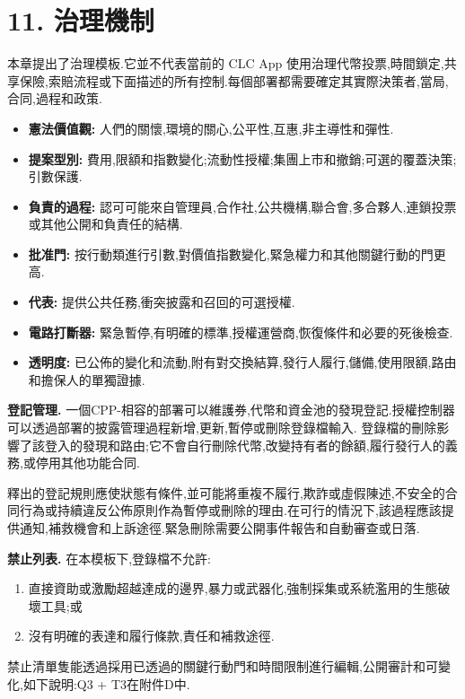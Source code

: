 \documentclass[11pt]{article}
\begin{document}
\section*{11. 治理機制}

本章提出了治理模板.它並不代表當前的 CLC App 使用治理代幣投票,時間鎖定,共享保險,索賠流程或下面描述的所有控制.每個部署都需要確定其實際決策者,當局,合同,過程和政策.

\begin{itemize}[leftmargin=*]
\item \textbf{憲法價值觀:} 人們的關懷,環境的關心,公平性,互惠,非主導性和彈性.
\item \textbf{提案型別:} 費用,限額和指數變化;流動性授權;集團上市和撤銷;可選的覆蓋決策;引數保護.
\item \textbf{負責的過程:} 認可可能來自管理員,合作社,公共機構,聯合會,多合夥人,連鎖投票或其他公開和負責任的結構.
\item \textbf{批准門:} 按行動類進行引數,對價值指數變化,緊急權力和其他關鍵行動的門更高.
\item \textbf{代表:} 提供公共任務,衝突披露和召回的可選授權.
\item \textbf{電路打斷器:} 緊急暫停,有明確的標準,授權運營商,恢復條件和必要的死後檢查.
\item \textbf{透明度:} 已公佈的變化和流動,附有對交換結算,發行人履行,儲備,使用限額,路由和擔保人的單獨證據.
\end{itemize}
\textbf{登記管理.} 一個CPP-相容的部署可以維護券,代幣和資金池的發現登記.授權控制器可以透過部署的披露管理過程新增,更新,暫停或刪除登錄檔輸入. 登錄檔的刪除影響了該登入的發現和路由;它不會自行刪除代幣,改變持有者的餘額,履行發行人的義務,或停用其他功能合同.

釋出的登記規則應使狀態有條件,並可能將重複不履行,欺詐或虛假陳述,不安全的合同行為或持續違反公佈原則作為暫停或刪除的理由.在可行的情況下,該過程應該提供通知,補救機會和上訴途徑.緊急刪除需要公開事件報告和自動審查或日落.

\textbf{禁止列表.} 在本模板下,登錄檔不允許:

\begin{enumerate}[leftmargin=*]
\item 直接資助或激勵超越達成的邊界,暴力或武器化,強制採集或系統濫用的生態破壞工具;或
\item 沒有明確的表達和履行條款,責任和補救途徑.
\end{enumerate}
禁止清單隻能透過採用已透過的關鍵行動門和時間限制進行編輯,公開審計和可變化,如下說明:Q3 + T3在附件D中.
\end{document}
